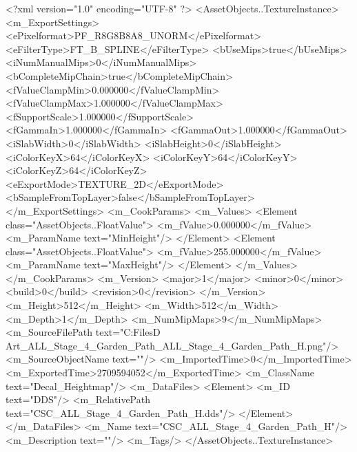 <?xml version="1.0" encoding="UTF-8" ?>
<AssetObjects..TextureInstance>
	<m_ExportSettings>
		<ePixelformat>PF_R8G8B8A8_UNORM</ePixelformat>
		<eFilterType>FT_B_SPLINE</eFilterType>
		<bUseMips>true</bUseMips>
		<iNumManualMips>0</iNumManualMips>
		<bCompleteMipChain>true</bCompleteMipChain>
		<fValueClampMin>0.000000</fValueClampMin>
		<fValueClampMax>1.000000</fValueClampMax>
		<fSupportScale>1.000000</fSupportScale>
		<fGammaIn>1.000000</fGammaIn>
		<fGammaOut>1.000000</fGammaOut>
		<iSlabWidth>0</iSlabWidth>
		<iSlabHeight>0</iSlabHeight>
		<iColorKeyX>64</iColorKeyX>
		<iColorKeyY>64</iColorKeyY>
		<iColorKeyZ>64</iColorKeyZ>
		<eExportMode>TEXTURE_2D</eExportMode>
		<bSampleFromTopLayer>false</bSampleFromTopLayer>
	</m_ExportSettings>
	<m_CookParams>
		<m_Values>
			<Element class="AssetObjects..FloatValue">
				<m_fValue>0.000000</m_fValue>
				<m_ParamName text="MinHeight"/>
			</Element>
			<Element class="AssetObjects..FloatValue">
				<m_fValue>255.000000</m_fValue>
				<m_ParamName text="MaxHeight"/>
			</Element>
		</m_Values>
	</m_CookParams>
	<m_Version>
		<major>1</major>
		<minor>0</minor>
		<build>0</build>
		<revision>0</revision>
	</m_Version>
	<m_Height>512</m_Height>
	<m_Width>512</m_Width>
	<m_Depth>1</m_Depth>
	<m_NumMipMaps>9</m_NumMipMaps>
	<m_SourceFilePath text="C:\Users\Shadow\Desktop\Working Files\3D Art\Decals\CSC_ALL_Stage_4_Garden_Path\textures\CSC_ALL_Stage_4_Garden_Path_H.png"/>
	<m_SourceObjectName text=""/>
	<m_ImportedTime>0</m_ImportedTime>
	<m_ExportedTime>2709594052</m_ExportedTime>
	<m_ClassName text="Decal_Heightmap"/>
	<m_DataFiles>
		<Element>
			<m_ID text="DDS"/>
			<m_RelativePath text="CSC_ALL_Stage_4_Garden_Path_H.dds"/>
		</Element>
	</m_DataFiles>
	<m_Name text="CSC_ALL_Stage_4_Garden_Path_H"/>
	<m_Description text=""/>
	<m_Tags/>
</AssetObjects..TextureInstance>

